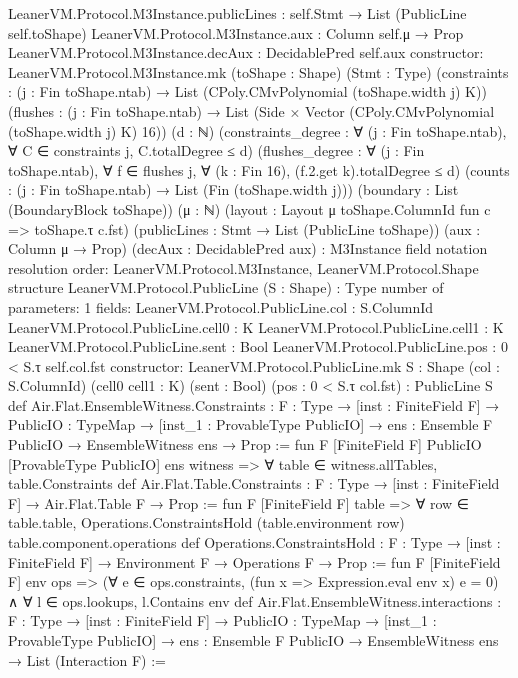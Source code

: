 \begin{srccode}[numbers=left,numbersep=3pt]
  LeanerVM.Protocol.M3Instance.publicLines : self.Stmt → List (PublicLine self.toShape)
  LeanerVM.Protocol.M3Instance.aux : Column self.μ → Prop
  LeanerVM.Protocol.M3Instance.decAux : DecidablePred self.aux
constructor:
  LeanerVM.Protocol.M3Instance.mk (toShape : Shape) (Stmt : Type)
    (constraints : (j : Fin toShape.ntab) → List (CPoly.CMvPolynomial (toShape.width j) K))
    (flushes : (j : Fin toShape.ntab) → List (Side × Vector (CPoly.CMvPolynomial (toShape.width j) K) 16)) (d : ℕ)
    (constraints_degree : ∀ (j : Fin toShape.ntab), ∀ C ∈ constraints j, C.totalDegree ≤ d)
    (flushes_degree : ∀ (j : Fin toShape.ntab), ∀ f ∈ flushes j, ∀ (k : Fin 16), (f.2.get k).totalDegree ≤ d)
    (counts : (j : Fin toShape.ntab) → List (Fin (toShape.width j))) (boundary : List (BoundaryBlock toShape)) (μ : ℕ)
    (layout : Layout μ toShape.ColumnId fun c => toShape.τ c.fst) (publicLines : Stmt → List (PublicLine toShape))
    (aux : Column μ → Prop) (decAux : DecidablePred aux) : M3Instance
field notation resolution order:
  LeanerVM.Protocol.M3Instance, LeanerVM.Protocol.Shape
structure LeanerVM.Protocol.PublicLine (S : Shape) : Type
number of parameters: 1
fields:
  LeanerVM.Protocol.PublicLine.col : S.ColumnId
  LeanerVM.Protocol.PublicLine.cell0 : K
  LeanerVM.Protocol.PublicLine.cell1 : K
  LeanerVM.Protocol.PublicLine.sent : Bool
  LeanerVM.Protocol.PublicLine.pos : 0 < S.τ self.col.fst
constructor:
  LeanerVM.Protocol.PublicLine.mk {S : Shape} (col : S.ColumnId) (cell0 cell1 : K) (sent : Bool)
    (pos : 0 < S.τ col.fst) : PublicLine S
def Air.Flat.EnsembleWitness.Constraints : {F : Type} →
  [inst : FiniteField F] →
    {PublicIO : TypeMap} →
      [inst_1 : ProvableType PublicIO] → {ens : Ensemble F PublicIO} → EnsembleWitness ens → Prop :=
fun {F} [FiniteField F] {PublicIO} [ProvableType PublicIO] {ens} witness =>
  ∀ table ∈ witness.allTables, table.Constraints
def Air.Flat.Table.Constraints : {F : Type} → [inst : FiniteField F] → Air.Flat.Table F → Prop :=
fun {F} [FiniteField F] table =>
  ∀ row ∈ table.table, Operations.ConstraintsHold (table.environment row) table.component.operations
def Operations.ConstraintsHold : {F : Type} → [inst : FiniteField F] → Environment F → Operations F → Prop :=
fun {F} [FiniteField F] env ops =>
  (∀ e ∈ ops.constraints, (fun x => Expression.eval env x) e = 0) ∧ ∀ l ∈ ops.lookups, l.Contains env
def Air.Flat.EnsembleWitness.interactions : {F : Type} →
  [inst : FiniteField F] →
    {PublicIO : TypeMap} →
      [inst_1 : ProvableType PublicIO] → {ens : Ensemble F PublicIO} → EnsembleWitness ens → List (Interaction F) :=

\end{srccode}

